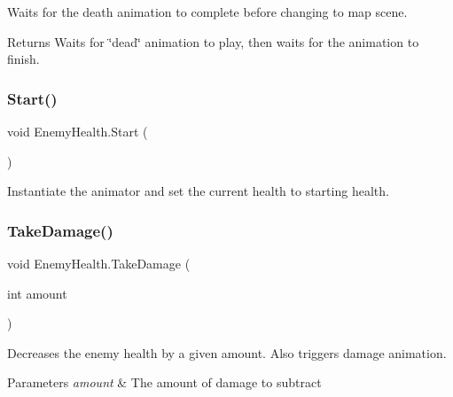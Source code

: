 Waits for the death animation to complete before changing to map scene. 

\begin{DoxyReturn}{Returns}
Waits for \char`\"{}dead\char`\"{} animation to play, then waits for the animation to finish.
\end{DoxyReturn}
\mbox{\label{class_enemy_health_a54cf9f16d11c4af18d2cabcea9d937e6}} 
\subsubsection{\texorpdfstring{Start()}{Start()}}
{\footnotesize\ttfamily void Enemy\+Health.\+Start (\begin{DoxyParamCaption}{ }\end{DoxyParamCaption})\hspace{0.3cm}{\ttfamily [private]}}



Instantiate the animator and set the current health to starting health. 

\mbox{\label{class_enemy_health_a4eb105bf6071ecd489d48a045de31a7c}} 
\subsubsection{\texorpdfstring{TakeDamage()}{TakeDamage()}}
{\footnotesize\ttfamily void Enemy\+Health.\+Take\+Damage (\begin{DoxyParamCaption}\item[{int}]{amount }\end{DoxyParamCaption})}



Decreases the enemy health by a given amount. Also triggers damage animation. 


\begin{DoxyParams}{Parameters}
{\em amount} & The amount of damage to subtract\\
\hline
\end{DoxyParams}
\mbox{\label{class_enemy_health_ae53051c82f68739b6ed749334e3c1d68}} 
